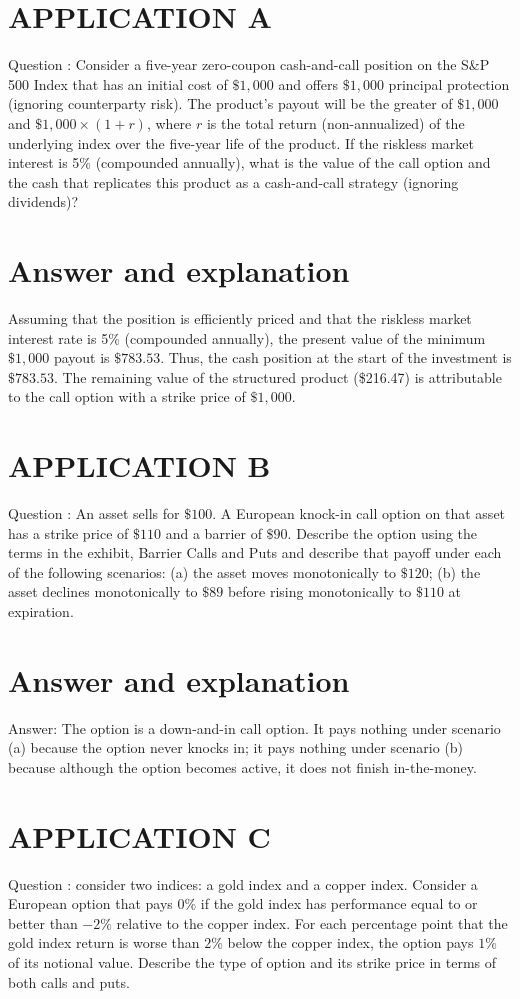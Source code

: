 \documentclass[11pt]{article}
\begin{document}
\section*{APPLICATION A}
Question : Consider a five-year zero-coupon cash-and-call position on the S\&P 500 Index that has an initial cost of $\$ 1,000$ and offers $\$ 1,000$ principal protection (ignoring counterparty risk). The product's payout will be the greater of $\$ 1,000$ and $\$ 1,000 \times(1+r)$, where $r$ is the total return (non-annualized) of the underlying index over the five-year life of the product. If the riskless market interest is 5\% (compounded annually), what is the value of the call option and the cash that replicates this product as a cash-and-call strategy (ignoring dividends)?

\section*{Answer and explanation}
Assuming that the position is efficiently priced and that the riskless market interest rate is 5\% (compounded annually), the present value of the minimum $\$ 1,000$ payout is $\$ 783.53$. Thus, the cash position at the start of the investment is $\$ 783.53$. The remaining value of the structured product (\$216.47) is attributable to the call option with a strike price of $\$ 1,000$.

\section*{APPLICATION B}
Question : An asset sells for $\$ 100$. A European knock-in call option on that asset has a strike price of $\$ 110$ and a barrier of $\$ 90$. Describe the option using the terms in the exhibit, Barrier Calls and Puts and describe that payoff under each of the following scenarios: (a) the asset moves monotonically to $\$ 120$; (b) the asset declines monotonically to $\$ 89$ before rising monotonically to $\$ 110$ at expiration.

\section*{Answer and explanation}
Answer: The option is a down-and-in call option. It pays nothing under scenario (a) because the option never knocks in; it pays nothing under scenario (b) because although the option becomes active, it does not finish in-the-money.

\section*{APPLICATION C}
Question : consider two indices: a gold index and a copper index. Consider a European option that pays $0 \%$ if the gold index has performance equal to or better than $-2 \%$ relative to the copper index. For each percentage point that the gold index return is worse than $2 \%$ below the copper index, the option pays $1 \%$ of its notional value. Describe the type of option and its strike price in terms of both calls and puts.
\end{document}
